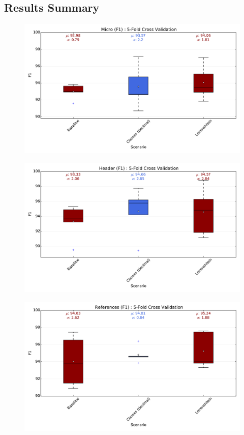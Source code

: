 \subsection{Results Summary}

\begin{figure}[h]
\center
\includegraphics[width=5.5in]{Figures/micro.pdf}
\caption{}
\label{fig:micro}
\end{figure}

\begin{figure}[h]
\center
\includegraphics[width=5.5in]{Figures/header.pdf}
\caption{}
\label{fig:header}
\end{figure}

\begin{figure}[h]
\center
\includegraphics[width=5.5in]{Figures/references.pdf}
\caption{}
\label{fig:references}
\end{figure}

